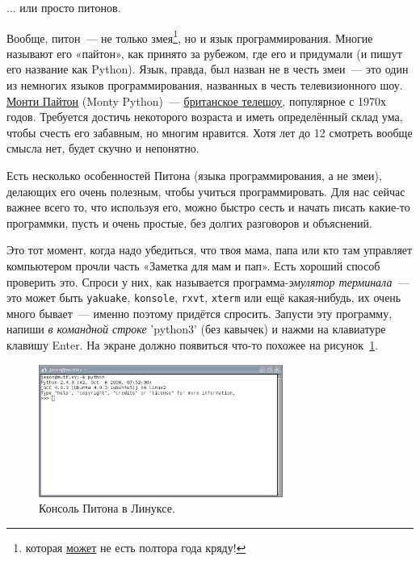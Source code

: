 ... или просто питонов.

Вообще, питон — не только змея\footnote{которая \href{https://ru.wikipedia.org/w/index.php?title=\%D0\%9F\%D0\%B8\%D1\%82\%D0\%BE\%D0\%BD\%D1\%8B&oldid=70828612\#.D0.9F.D0.B8.D1.82.D0.B0.D0.BD.D0.B8.D0.B5}{может} не есть полтора года кряду!}, но и язык программирования. Многие называют его «пайтон», как принято за рубежом, где его и придумали (и пишут его название как Python). Язык, правда, был назван не в честь змеи — это один из немногих языков программирования, названных в честь телевизионного шоу. \href{http://www.youtube.com/watch?v=YO2xZbac7lw&list=PL89E217812DCA2BDA}{Монти Пайтон} (Monty Python) — \href{http://www.montypython.com/}{британское телешоу}, популярное с 1970х годов. Требуется достичь некоторого возраста и иметь определённый склад ума, чтобы счесть его забавным, но многим нравится. Хотя лет до 12 смотреть вообще смысла нет, будет скучно и непонятно.

Есть несколько особенностей Питона (языка программирования, а не змеи), делающих его очень полезным, чтобы учиться программировать. Для нас сейчас важнее всего то, что используя его, можно быстро сесть и начать писать какие-то программки, пусть и очень простые, без долгих разговоров и объяснений.

Это тот момент, когда надо убедиться, что твоя мама, папа или кто там управляет компьютером прочли часть «Заметка для мам и пап». Есть хороший способ проверить это. Спроси у них, как называется программа-\emph{эмулятор терминала} — это может быть \texttt{yakuake}, \texttt{konsole}, \texttt{rxvt}, \texttt{xterm} или ещё какая-нибудь, их очень много бывает — именно поэтому придётся спросить. Запусти эту программу, напиши \emph{в командной строке} 'python3' (без кавычек) и нажми на клавиатуре клавишу Enter. На экране должно появиться что-то похожее на рисунок \ref{fig4}.

\begin{figure}
\begin{center}
\includegraphics[width=80mm]{../en/figure4.eps}
\end{center}
\caption{Консоль Питона в Линуксе.}\label{fig4}
\end{figure}

